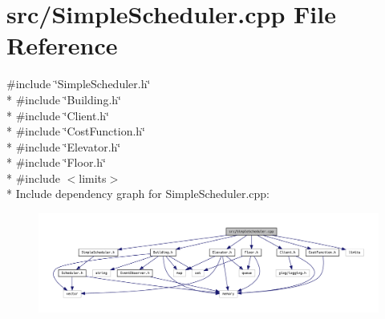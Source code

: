 \section{src/\+Simple\+Scheduler.cpp File Reference}
\label{_simple_scheduler_8cpp}
{\ttfamily \#include \char`\"{}Simple\+Scheduler.\+h\char`\"{}}\\*
{\ttfamily \#include \char`\"{}Building.\+h\char`\"{}}\\*
{\ttfamily \#include \char`\"{}Client.\+h\char`\"{}}\\*
{\ttfamily \#include \char`\"{}Cost\+Function.\+h\char`\"{}}\\*
{\ttfamily \#include \char`\"{}Elevator.\+h\char`\"{}}\\*
{\ttfamily \#include \char`\"{}Floor.\+h\char`\"{}}\\*
{\ttfamily \#include $<$limits$>$}\\*
Include dependency graph for Simple\+Scheduler.\+cpp\+:
\nopagebreak
\begin{figure}[H]
\begin{center}
\leavevmode
\includegraphics[width=350pt]{_simple_scheduler_8cpp__incl}
\end{center}
\end{figure}
